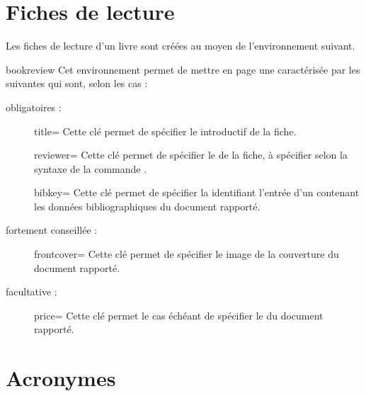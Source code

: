 \documentclass{letgut}
\begin{document}
\section{Fiches de lecture}
\label{sec:fiches-de-lecture}

Les fiches de lecture d'un livre sont créées au moyen de l'environnement
 suivant.

\begin{docEnvironment}[doclang/environment content=fiche de lecture]{bookreview}{}
  Cet environnement permet de mettre en page une 
  caractérisée par les  suivantes qui sont, selon les
  cas :
  \begin{description}
  \item[obligatoires :]
    \begin{docKey}{title}{=}{\valinitdef}
      Cette clé permet de spécifier le  introductif de la fiche.
    \end{docKey}
    \begin{docKey}{reviewer}{=}{\valinitdef}
      Cette clé permet de spécifier le  de la fiche, à spécifier
      selon la syntaxe de la commande .
    \end{docKey}
    \begin{docKey}{bibkey}{=}{\valinitdef}
      Cette clé permet de spécifier la  identifiant l'entrée d'un
       contenant les données bibliographiques du document rapporté.
    \end{docKey}
  \item[fortement conseillée :]
    \begin{docKey}{frontcover}{=}{\valinitdef}
      Cette clé permet de spécifier le  image de la couverture du
      document rapporté.
    \end{docKey}
  \item[facultative :]
    \begin{docKey}{price}{=}{\valinitdef}
      Cette clé permet le cas échéant de spécifier le  du document rapporté.
    \end{docKey}
  \end{description}
\end{docEnvironment}

\section{Acronymes}
\label{sec:acronymes}
\end{document}
